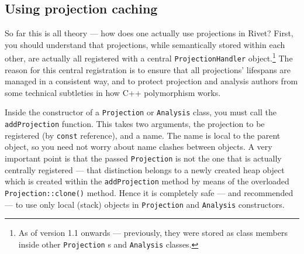 \documentclass{JHEP3}
\newcommand{\code}[1]{\texttt{#1}\xspace}
\begin{document}
\subsection{Using projection caching}
So far this is all theory --- how does one actually use projections in Rivet?
First, you should understand that projections, while semantically stored within
each other, are actually all registered with a central \code{ProjectionHandler}
object.\footnote{As of version 1.1 onwards --- previously, they were stored as
  class members inside other \code{Projection}s and \code{Analysis} classes.}
The reason for this central registration is to ensure that all projections'
lifespans are managed in a consistent way, and to protect projection and
analysis authors from some technical subtleties in how C++ polymorphism works.

Inside the constructor of a \code{Projection} or \code{Analysis} class, you must
call the \code{addProjection} function. This takes two arguments, the projection
to be registered (by \code{const} reference), and a name. The name is local to
the parent object, so you need not worry about name clashes between objects. A
very important point is that the passed \code{Projection} is not the one that is
actually centrally registered --- that distinction belongs to a newly created
heap object which is created within the \code{addProjection} method by means of
the overloaded \code{Projection::clone()} method. Hence it is completely safe
--- and recommended --- to use only local (stack) objects in \code{Projection}
and \code{Analysis} constructors.
\end{document}
